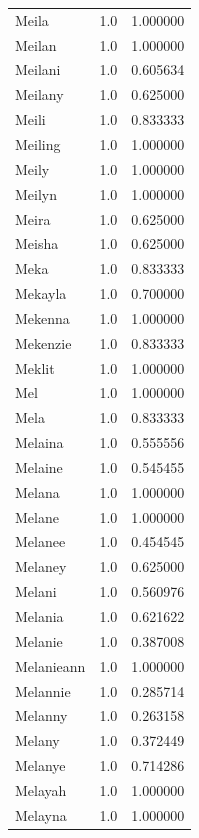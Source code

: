 \documentclass[
  letterpaper,
  DIV=11,
  numbers=noendperiod]{scrreprt}
\begin{document}
\begin{tabular}{lrr}
Meila           &   1.0 &   1.000000 \\
Meilan          &   1.0 &   1.000000 \\
Meilani         &   1.0 &   0.605634 \\
Meilany         &   1.0 &   0.625000 \\
Meili           &   1.0 &   0.833333 \\
Meiling         &   1.0 &   1.000000 \\
Meily           &   1.0 &   1.000000 \\
Meilyn          &   1.0 &   1.000000 \\
Meira           &   1.0 &   0.625000 \\
Meisha          &   1.0 &   0.625000 \\
Meka            &   1.0 &   0.833333 \\
Mekayla         &   1.0 &   0.700000 \\
Mekenna         &   1.0 &   1.000000 \\
Mekenzie        &   1.0 &   0.833333 \\
Meklit          &   1.0 &   1.000000 \\
Mel             &   1.0 &   1.000000 \\
Mela            &   1.0 &   0.833333 \\
Melaina         &   1.0 &   0.555556 \\
Melaine         &   1.0 &   0.545455 \\
Melana          &   1.0 &   1.000000 \\
Melane          &   1.0 &   1.000000 \\
Melanee         &   1.0 &   0.454545 \\
Melaney         &   1.0 &   0.625000 \\
Melani          &   1.0 &   0.560976 \\
Melania         &   1.0 &   0.621622 \\
Melanie         &   1.0 &   0.387008 \\
Melanieann      &   1.0 &   1.000000 \\
Melannie        &   1.0 &   0.285714 \\
Melanny         &   1.0 &   0.263158 \\
Melany          &   1.0 &   0.372449 \\
Melanye         &   1.0 &   0.714286 \\
Melayah         &   1.0 &   1.000000 \\
Melayna         &   1.0 &   1.000000 \\

\end{tabular}
\end{document}
